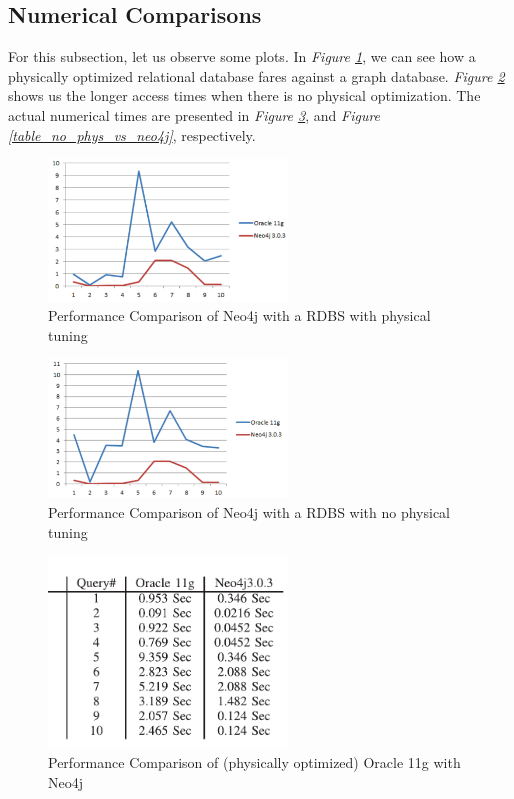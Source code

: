 \documentclass[10pt,        %
               a4paper,     %
               journal,     %
               ]{IEEEtran}
\begin{document}
\subsection{Numerical Comparisons}
For this subsection, let us observe some plots. In \textit{Figure \ref{graph_phys_vs_neo4j}}, we can see how a physically optimized relational database fares against a graph database. \textit{Figure \ref{graph_no_phys_vs_neo4j}} shows us the longer access times when there is no physical optimization. The actual numerical times are presented in \textit{Figure \ref{table_phys_vs_neo4j}}, and \textit{Figure \ref{table_no_phys_vs_neo4j}}, respectively. \par
\begin{figure}[!t]
	\centering
	\includegraphics[width=2.5in]{plots/phys_vs_neo4j}
	\caption{Performance Comparison of Neo4j with a RDBS with physical tuning \cite{IEEEpaper1:comparison}}
	\label{graph_phys_vs_neo4j}
\end{figure}

\begin{figure}[!t]
	\centering
	\includegraphics[width=2.5in]{plots/no phys vs neo4j}
	\caption{Performance Comparison of Neo4j with a RDBS with no physical tuning \cite{IEEEpaper1:comparison}}
	\label{graph_no_phys_vs_neo4j}
\end{figure}

\begin{figure}[!t]
	\centering
	\includegraphics[width=2.5in]{plots/phys vs neo4j table}
	\caption{Performance Comparison of (physically optimized) Oracle 11g with Neo4j \cite{IEEEpaper1:comparison}}
	\label{table_phys_vs_neo4j}
\end{figure}
\end{document}
